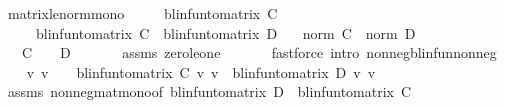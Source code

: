\begin{isabellebody}
%
\isadelimproof
\isanewline
%
\endisadelimproof
\isanewline
{}\isamarkupfalse%
\ matrix{\isacharunderscore}{\kern0pt}le{\isacharunderscore}{\kern0pt}norm{\isacharunderscore}{\kern0pt}mono{\isacharcolon}{\kern0pt}\isanewline
\ \ \ {\isachardoublequoteopen}{}\ {\isasymle}\ {\isacharparenleft}{\kern0pt}blinfun{\isacharunderscore}{\kern0pt}to{\isacharunderscore}{\kern0pt}matrix\ C{\isacharparenright}{\kern0pt}{\isachardoublequoteclose}\isanewline
\ \ \ \ \ {\isachardoublequoteopen}{\isacharparenleft}{\kern0pt}blinfun{\isacharunderscore}{\kern0pt}to{\isacharunderscore}{\kern0pt}matrix\ C{\isacharparenright}{\kern0pt}\ {\isasymle}\ {\isacharparenleft}{\kern0pt}blinfun{\isacharunderscore}{\kern0pt}to{\isacharunderscore}{\kern0pt}matrix\ D{\isacharparenright}{\kern0pt}{\isachardoublequoteclose}\isanewline
\ \ \ {\isachardoublequoteopen}norm\ C\ {\isasymle}\ norm\ D{\isachardoublequoteclose}\isanewline
%
\isadelimproof
%
\endisadelimproof
%
\isatagproof
{}\isamarkupfalse%
\ {\isacharminus}{\kern0pt}\isanewline
\ \ \isamarkupfalse%
\ {\isachardoublequoteopen}{}\ {\isasymle}\ C\ {}{\isachardoublequoteclose}\ {\isachardoublequoteopen}{}\ {\isasymle}\ D\ {}{\isachardoublequoteclose}\isanewline
\ \ \ \ \isamarkupfalse%
\ assms\ zero{\isacharunderscore}{\kern0pt}le{\isacharunderscore}{\kern0pt}one\ \isanewline
\ \ \ \ \isamarkupfalse%
\ {\isacharparenleft}{\kern0pt}fastforce\ intro{\isacharbang}{\kern0pt}{\isacharcolon}{\kern0pt}\ nonneg{\isacharunderscore}{\kern0pt}blinfun{\isacharunderscore}{\kern0pt}nonneg{\isacharparenright}{\kern0pt}{\isacharplus}{\kern0pt}\isanewline
\ \ \isamarkupfalse%
\ {\isachardoublequoteopen}{\isasymAnd}v{\isachardot}{\kern0pt}\ v\ {\isasymge}\ {}\ {\isasymLongrightarrow}\ blinfun{\isacharunderscore}{\kern0pt}to{\isacharunderscore}{\kern0pt}matrix\ C\ {\isacharasterisk}{\kern0pt}v\ v\ {\isasymle}\ blinfun{\isacharunderscore}{\kern0pt}to{\isacharunderscore}{\kern0pt}matrix\ D\ {\isacharasterisk}{\kern0pt}v\ v{\isachardoublequoteclose}\isanewline
\ \ \ \ \isamarkupfalse%
\ assms\ nonneg{\isacharunderscore}{\kern0pt}mat{\isacharunderscore}{\kern0pt}mono{\isacharbrackleft}{\kern0pt}of\ {\isachardoublequoteopen}blinfun{\isacharunderscore}{\kern0pt}to{\isacharunderscore}{\kern0pt}matrix\ D\ {\isacharminus}{\kern0pt}\ blinfun{\isacharunderscore}{\kern0pt}to{\isacharunderscore}{\kern0pt}matrix\ C{\isachardoublequoteclose}{\isacharbrackright}{\kern0pt}\isanewline

\end{isabellebody}
